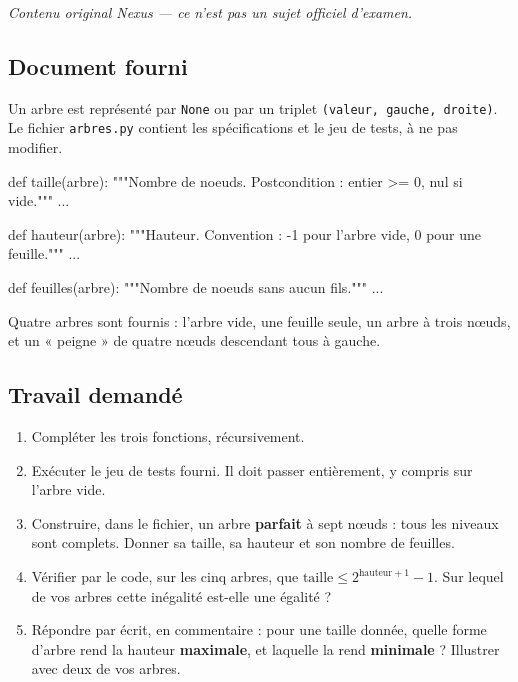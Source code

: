 \medskip
\textit{Contenu original Nexus --- ce n'est pas un sujet officiel d'examen.}

\subsection*{Document fourni}

Un arbre est représenté par \lstinline{None} ou par un triplet
\lstinline!(valeur, gauche, droite)!. Le fichier \lstinline{arbres.py} contient
les spécifications et le jeu de tests, à ne pas modifier.

\begin{python}
def taille(arbre):
    """Nombre de noeuds. Postcondition : entier >= 0, nul si vide."""
    ...

def hauteur(arbre):
    """Hauteur. Convention : -1 pour l'arbre vide, 0 pour une feuille."""
    ...

def feuilles(arbre):
    """Nombre de noeuds sans aucun fils."""
    ...
\end{python}

Quatre arbres sont fournis : l'arbre vide, une feuille seule, un arbre à trois
nœuds, et un « peigne » de quatre nœuds descendant tous à gauche.

\subsection*{Travail demandé}

\begin{enumerate}
  \item Compléter les trois fonctions, récursivement.

  \item Exécuter le jeu de tests fourni. Il doit passer entièrement, y compris
    sur l'arbre vide.

  \item Construire, dans le fichier, un arbre \textbf{parfait} à sept nœuds :
    tous les niveaux sont complets. Donner sa taille, sa hauteur et son nombre
    de feuilles.

  \item Vérifier par le code, sur les cinq arbres, que
    $\text{taille} \leqslant 2^{\text{hauteur}+1} - 1$. Sur lequel de vos arbres
    cette inégalité est-elle une égalité ?

  \item Répondre par écrit, en commentaire : pour une taille donnée, quelle
    forme d'arbre rend la hauteur \textbf{maximale}, et laquelle la rend
    \textbf{minimale} ? Illustrer avec deux de vos arbres.
\end{enumerate}

